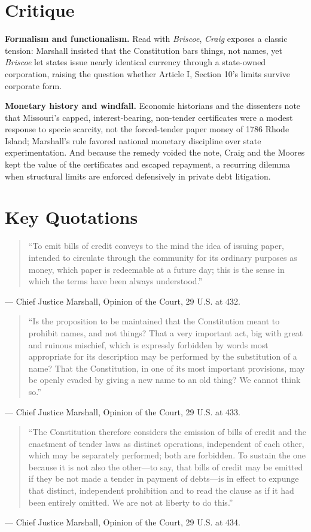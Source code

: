 \documentclass[12pt]{article}
\begin{document}
\section{Critique}

\textbf{Formalism and functionalism.} Read with \textit{Briscoe}, \textit{Craig} exposes a classic tension: Marshall insisted that the Constitution bars things, not names, yet \textit{Briscoe} let states issue nearly identical currency through a state-owned corporation, raising the question whether Article I, Section 10's limits survive corporate form.

\textbf{Monetary history and windfall.} Economic historians and the dissenters note that Missouri's capped, interest-bearing, non-tender certificates were a modest response to specie scarcity, not the forced-tender paper money of 1786 Rhode Island; Marshall's rule favored national monetary discipline over state experimentation. And because the remedy voided the note, Craig and the Moores kept the value of the certificates and escaped repayment, a recurring dilemma when structural limits are enforced defensively in private debt litigation.

\section{Key Quotations}

\begin{quote}
``To emit bills of credit conveys to the mind the idea of issuing paper, intended to circulate through the community for its ordinary purposes as money, which paper is redeemable at a future day; this is the sense in which the terms have been always understood.''
\end{quote}
\noindent --- Chief Justice Marshall, Opinion of the Court, 29 U.S. at 432.

\begin{quote}
``Is the proposition to be maintained that the Constitution meant to prohibit names, and not things? That a very important act, big with great and ruinous mischief, which is expressly forbidden by words most appropriate for its description may be performed by the substitution of a name? That the Constitution, in one of its most important provisions, may be openly evaded by giving a new name to an old thing? We cannot think so.''
\end{quote}
\noindent --- Chief Justice Marshall, Opinion of the Court, 29 U.S. at 433.

\begin{quote}
``The Constitution therefore considers the emission of bills of credit and the enactment of tender laws as distinct operations, independent of each other, which may be separately performed; both are forbidden. To sustain the one because it is not also the other---to say, that bills of credit may be emitted if they be not made a tender in payment of debts---is in effect to expunge that distinct, independent prohibition and to read the clause as if it had been entirely omitted. We are not at liberty to do this.''
\end{quote}
\noindent --- Chief Justice Marshall, Opinion of the Court, 29 U.S. at 434.
\end{document}
